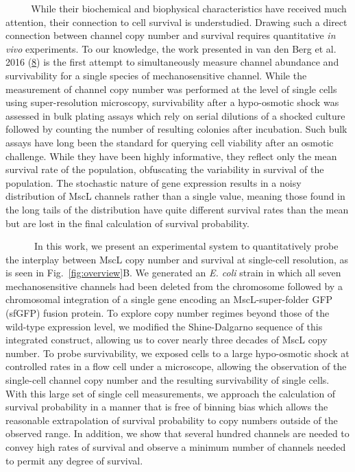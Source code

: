 ~~~ ~
While
their
biochemical
and
biophysical
characteristics
have
received
much
attention,
their
connection
to
cell
survival
is
understudied.
Drawing
such a
direct
connection
between
channel
copy
number
and
survival
requires
quantitative
\emph{in
vivo}
experiments.
To our
knowledge,
the
work
presented
in van
den
Berg
et al.
2016
(\protect\hyperlink{ref-vandenberg2016}{8})
is the
first
attempt
to
simultaneously
measure
channel
abundance
and
survivability
for a
single
species
of
mechanosensitive
channel.
While
the
measurement
of
channel
copy
number
was
performed
at the
level
of
single
cells
using
super-resolution
microscopy,
survivability
after
a
hypo-osmotic
shock
was
assessed
in
bulk
plating
assays
which
rely
on
serial
dilutions
of a
shocked
culture
followed
by
counting
the
number
of
resulting
colonies
after
incubation.
Such
bulk
assays
have
long
been
the
standard
for
querying
cell
viability
after
an
osmotic
challenge.
While
they
have
been
highly
informative,
they
reflect
only
the
mean
survival
rate
of the
population,
obfuscating
the
variability
in
survival
of the
population.
The
stochastic
nature
of
gene
expression
results
in a
noisy
distribution
of
MscL
channels
rather
than a
single
value,
meaning
those
found
in the
long
tails
of the
distribution
have
quite
different
survival
rates
than
the
mean
but
are
lost
in the
final
calculation
of
survival
probability.

~ ~ ~
~In
this
work,
we
present
an
experimental
system
to
quantitatively
probe
the
interplay
between
MscL
copy
number
and
survival
at
single-cell
resolution,
as is
seen
in
Fig.~\ref{fig:overview}B.
We
generated
an
\emph{E.
coli}
strain
in
which
all
seven
mechanosensitive
channels
had
been
deleted
from
the
chromosome
followed
by a
chromosomal
integration
of a
single
gene
encoding
an
MscL-super-folder
GFP
(sfGFP)
fusion
protein.
To
explore
copy
number
regimes
beyond
those
of the
wild-type
expression
level,
we
modified
the
Shine-Dalgarno
sequence
of
this
integrated
construct,
allowing
us to
cover
nearly
three
decades
of
MscL
copy
number.
To
probe
survivability,
we
exposed
cells
to a
large
hypo-osmotic
shock
at
controlled
rates
in a
flow
cell
under
a
microscope,
allowing
the
observation
of the
single-cell
channel
copy
number
and
the
resulting
survivability
of
single
cells.
With
this
large
set of
single
cell
measurements,
we
approach
the
calculation
of
survival
probability
in a
manner
that
is
free
of
binning
bias
which
allows
the
reasonable
extrapolation
of
survival
probability
to
copy
numbers
outside
of the
observed
range.
In
addition,
we
show
that
several
hundred
channels
are
needed
to
convey
high
rates
of
survival
and
observe
a
minimum
number
of
channels
needed
to
permit
any
degree
of
survival.

